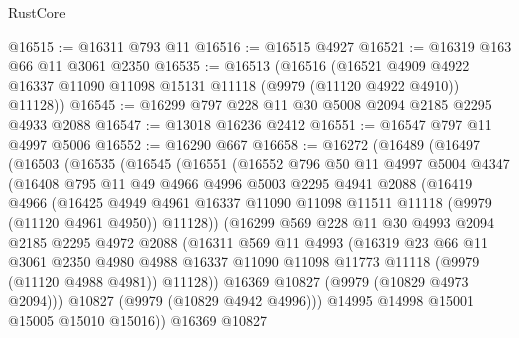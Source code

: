 \begin{lexlean}{RustCore}
\begin{coremodule}
@16515 := @16311 @793 @11
@16516 := @16515 @4927
@16521 := @16319 @163 @66 @11 @3061 @2350
@16535 := @16513
    (@16516
      (@16521 @4909 @4922 @16337 @11090 @11098 @15131 @11118 (@9979 (@11120 @4922 @4910)) @11128))
@16545 := @16299 @797 @228 @11 @30 @5008 @2094 @2185 @2295 @4933 @2088
@16547 := @13018 @16236 @2412
@16551 := @16547 @797 @11 @4997 @5006
@16552 := @16290 @667
@16658 := @16272
    (@16489
      (@16497
        (@16503
          (@16535
            (@16545
              (@16551
                (@16552
                  @796
                  @50
                  @11
                  @4997
                  @5004
                  @4347
                  (@16408
                    @795
                    @11
                    @49
                    @4966
                    @4996
                    @5003
                    @2295
                    @4941
                    @2088
                    (@16419
                      @4966
                      (@16425
                        @4949
                        @4961
                        @16337
                        @11090
                        @11098
                        @11511
                        @11118
                        (@9979 (@11120 @4961 @4950))
                        @11128))
                    (@16299
                      @569
                      @228
                      @11
                      @30
                      @4993
                      @2094
                      @2185
                      @2295
                      @4972
                      @2088
                      (@16311
                        @569
                        @11
                        @4993
                        (@16319
                          @23
                          @66
                          @11
                          @3061
                          @2350
                          @4980
                          @4988
                          @16337
                          @11090
                          @11098
                          @11773
                          @11118
                          (@9979 (@11120 @4988 @4981))
                          @11128))
                      @16369
                      @10827
                      (@9979 (@10829 @4973 @2094)))
                    @10827
                    (@9979 (@10829 @4942 @4996)))
                  @14995
                  @14998
                  @15001
                  @15005
                  @15010
                  @15016))
              @16369
              @10827

\end{coremodule}
\end{lexlean}

